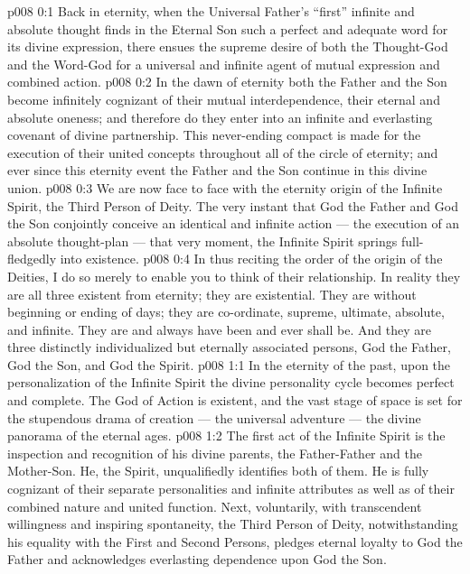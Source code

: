 \author{Divine Counsellor}
\vs p008 0:1 Back in eternity, when the Universal Father’s “first” infinite and absolute thought finds in the Eternal Son such a perfect and adequate word for its divine expression, there ensues the supreme desire of both the Thought\hyp{}God and the Word\hyp{}God for a universal and infinite agent of mutual expression and combined action.
\vs p008 0:2 In the dawn of eternity both the Father and the Son become infinitely cognizant of their mutual interdependence, their eternal and absolute oneness; and therefore do they enter into an infinite and everlasting covenant of divine partnership. This never\hyp{}ending compact is made for the execution of their united concepts throughout all of the circle of eternity; and ever since this eternity event the Father and the Son continue in this divine union.
\vs p008 0:3 We are now face to face with the eternity origin of the Infinite Spirit, the Third Person of Deity. The very instant that God the Father and God the Son conjointly conceive an identical and infinite action --- the execution of an absolute thought\hyp{}plan --- that very moment, the Infinite Spirit springs full\hyp{}fledgedly into existence.
\vs p008 0:4 \pc In thus reciting the order of the origin of the Deities, I do so merely to enable you to think of their relationship. In reality they are all three existent from eternity; they are existential. They are without beginning or ending of days; they are co\hyp{}ordinate, supreme, ultimate, absolute, and infinite. They are and always have been and ever shall be. And they are three distinctly individualized but eternally associated persons, God the Father, God the Son, and God the Spirit.
\vs p008 1:1 In the eternity of the past, upon the personalization of the Infinite Spirit the divine personality cycle becomes perfect and complete. The God of Action is existent, and the vast stage of space is set for the stupendous drama of creation --- the universal adventure --- the divine panorama of the eternal ages.
\vs p008 1:2 The first act of the Infinite Spirit is the inspection and recognition of his divine parents, the Father\hyp{}Father and the Mother\hyp{}Son. He, the Spirit, unqualifiedly identifies both of them. He is fully cognizant of their separate personalities and infinite attributes as well as of their combined nature and united function. Next, voluntarily, with transcendent willingness and inspiring spontaneity, the Third Person of Deity, notwithstanding his equality with the First and Second Persons, pledges eternal loyalty to God the Father and acknowledges everlasting dependence upon God the Son.
